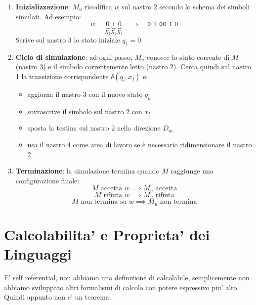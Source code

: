 \begin{enumerate}
  \item \textbf{Inizializzazione}: $ M_u $ ricodifica $ w $ sul nastro 2 secondo lo schema dei simboli simulati. Ad esempio:
    \[
      w = \underbrace{0}_{X_1}\underbrace{1}_{X_2}\underbrace{0}_{X_1} \quad \Longrightarrow \quad \texttt{0 1 00 1 0}
    \]
    Scrive sul nastro 3 lo stato iniziale $ q_1 = 0 $.

  \item \textbf{Ciclo di simulazione}: ad ogni passo, $ M_u $ conosce lo stato corrente di $ M $ (nastro 3) e il simbolo correntemente letto (nastro 2). Cerca quindi sul nastro 1 la transizione corrispondente $ \delta(q_i, x_j) $ e:
    \begin{itemize}
      \item aggiorna il nastro 3 con il nuovo stato $ q_k $
      \item sovrascrive il simbolo sul nastro 2 con $ x_l $
      \item sposta la testina sul nastro 2 nella direzione $ D_m $
      \item usa il nastro 4 come area di lavoro se è necessario ridimensionare il nastro 2
    \end{itemize}

  \item \textbf{Terminazione}: la simulazione termina quando $ M $ raggiunge una configurazione finale:
    \[
      M \text{ accetta } w \implies M_u \text{ accetta}
    \]
    \[
      M \text{ rifiuta } w \implies M_u \text{ rifiuta}
    \]
    \[
      M \text{ non termina su } w \implies M_u \text{ non termina}
    \]
\end{enumerate}


\section{Calcolabilita' e Proprieta' dei Linguaggi}
E' self referential, non abbiamo una definizione di calcolabile, semplicemente non abbiamo sviluppato altri formalismi di calcolo con potere espressivo piu' alto. Quindi appunto non e' un teorema.


